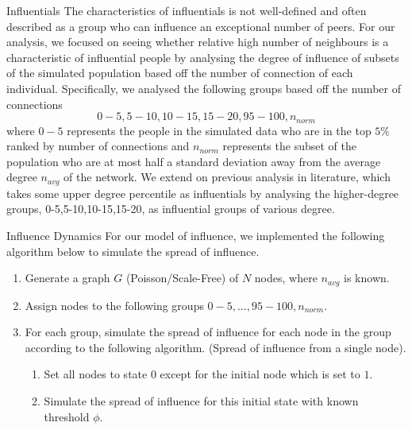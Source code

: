 \documentclass[10pt, oneside, reqno]{amsart}
\makeatletter
\theoremstyle{plain}%
\theoremstyle{definition}
\theoremstyle{remark}
\renewcommand\subsection{\@startsection{subsection}{2}%
  \z@{.5\linespacing\@plus.7\linespacing}{-.5em}%
  {\normalfont\scshape}}
\makeatother
\begin{document}
\subsection{Influentials}
The characteristics of influentials is not well-defined and often described as a group who can influence an exceptional number of peers.
For our analysis, we focused on seeing whether relative high number of neighbours is a characteristic of influential people by analysing the degree of influence of subsets of the simulated population based off the number of connection of each individual.
Specifically, we analysed the following groups based off the number of connections
\[ 0-5, 5-10, 10-15, 15-20, 95-100, n_{norm} \]
where $0-5$ represents the people in the simulated data who are in the top $5\%$ ranked by number of connections and $n_{norm}$ represents the subset of the population who are at most half a standard deviation away from the average degree $n_{avg}$ of the network.
We extend on previous analysis in literature, which takes some upper degree percentile as influentials\cite{Influential} by analysing the higher-degree groups, 0-5,5-10,10-15,15-20, as  influential groups of various degree.




\subsection{Influence Dynamics}
For our model of influence, we implemented the following algorithm below to simulate the spread of influence\cite{github}.

\begin{enumerate}
    \item Generate a graph $G$ (Poisson/Scale-Free) of $N$ nodes, where $n_{avg}$ is known.
    \item Assign nodes to the following groups $0-5,\dots,95-100,n_{norm}$.
    \item For each group, simulate the spread of influence for each node in the group according to the following algorithm. (Spread of influence from a single node).
    \begin{enumerate}
        \item Set all nodes to state $0$ except for the initial node which is set to $1$.
        \item Simulate the spread of influence for this initial state with known threshold $\phi$.
    \end{enumerate}
\end{enumerate}
\end{document}
